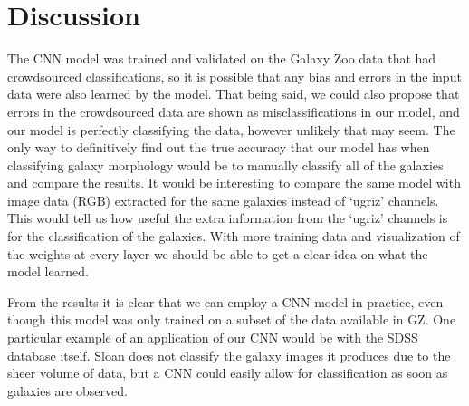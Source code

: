 \section{Discussion}
\label{sec:dis}
The CNN model was trained and validated on the Galaxy Zoo data that had crowdsourced classifications, so it is possible that any bias and errors in the input data were also learned by the model. 
That being said, we could also propose that errors in the crowdsourced data are shown as misclassifications in our model, and our model is perfectly classifying the data, however unlikely that may seem. 
The only way to definitively find out the true accuracy that our model has when classifying galaxy morphology would be to manually classify all of the galaxies and compare the results. 
It would be interesting to compare the same model with image data (RGB) extracted for the same galaxies instead of `ugriz' channels. This would tell us how useful the extra information from the `ugriz' channels is for the classification of the galaxies.
With more training data and visualization of the weights at every layer we should be able to get a clear idea on what the model learned.

From the results it is clear that we can employ a CNN model in practice, even though this model was only trained on a subset of the data available in GZ.
One particular example of an application of our CNN would be with the SDSS database itself. Sloan does not classify the galaxy images it produces due to the sheer volume of data, but a CNN could easily allow for classification as soon as galaxies are observed. 


